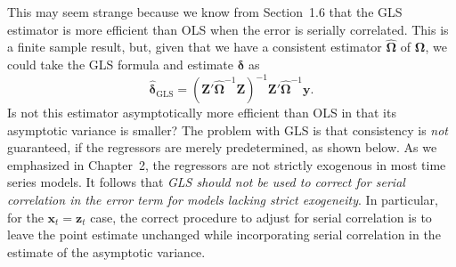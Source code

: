 This may seem strange because we know from Section~1.6 that the GLS estimator
is more efficient than OLS when the error is serially correlated. This is a finite
sample result, but, given that we have a consistent estimator $\hat{\bm{\Omega}}$ of $\bm{\Omega}$, we could take
the GLS formula and estimate $\bm{\delta}$ as
\[
  \hat{\bm{\delta}}_{\text{GLS}} = (\mathbf{Z}'\hat{\bm{\Omega}}^{-1}\mathbf{Z})^{-1}\mathbf{Z}'\hat{\bm{\Omega}}^{-1}\mathbf{y}.
\]
Is not this estimator asymptotically more efficient than OLS in that its asymptotic
variance is smaller? The problem with GLS is that consistency is \emph{not} guaranteed,
if the regressors are merely predetermined, as shown below. As we emphasized
in Chapter~2, the regressors are not strictly exogenous in most time series models.
It follows that \emph{GLS should not be used to correct for serial correlation in the
error term for models lacking strict exogeneity}. In particular, for the $\mathbf{x}_t = \mathbf{z}_t$ case,
the correct procedure to adjust for serial correlation is to leave the point estimate
unchanged while incorporating serial correlation in the estimate of the asymptotic
variance.

